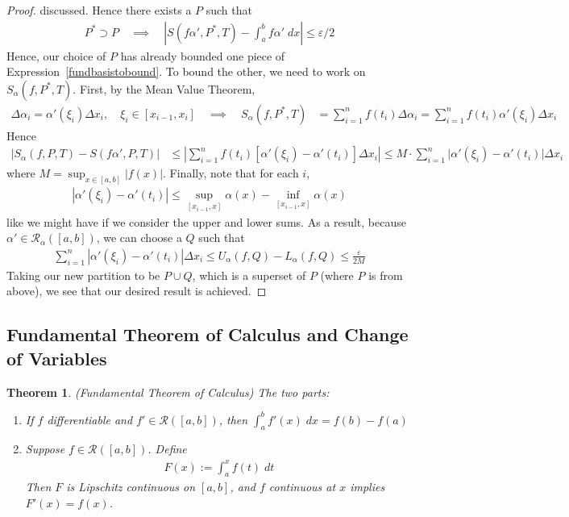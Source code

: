 \documentclass[12pt]{article}
\numberwithin{equation}{section} %
\theoremstyle{plain}
\newtheorem{thm}{Theorem}[section]
\theoremstyle{definition}
\theoremstyle{remark}
\begin{document}
\begin{proof}
discussed. Hence there exists a $P$ such that
\begin{align*}
  P^*\supset P
  \quad\implies\quad
  \left\lvert S(f\alpha',P^*,T) - \int^b_a f\alpha'\;dx
  \right\rvert \leq \varepsilon/2
\end{align*}
Hence, our choice of $P$ has already bounded one piece
of Expression~\ref{fundbasistobound}. To bound the other, we need to
work on $S_\alpha(f,P^*,T)$. First, by the Mean Value Theorem,
\begin{align*}
  \Delta\alpha_i = \alpha'(\xi_i) \Delta x_i,
  \quad \xi_i \in [x_{i-1}, x_i]
  \quad\implies\quad
  S_\alpha(f,P^*,T)
  &= \sum^n_{i=1} f(t_i) \Delta\alpha_i
  = \sum^n_{i=1} f(t_i)\alpha'(\xi_i) \Delta x_i
\end{align*}
Hence
\begin{align*}
  \left\lvert S_\alpha(f,P,T) - S(f\alpha',P,T)
      \right\rvert &\leq
      \left\lvert \sum^n_{i=1} f(t_i)\left[\alpha'(\xi_i) -
      \alpha'(t_i)\right] \Delta x_i \right\rvert
  \leq M \cdot
      \sum^n_{i=1} \big\lvert \alpha'(\xi_i) -
      \alpha'(t_i)\big\rvert \Delta x_i
\end{align*}
where $M =\sup_{x\in[a,b]}\left\lvert f(x)\right\rvert$. Finally, note
that for each $i$,
\begin{align*}
    |\alpha'(\xi_i) - \alpha'(t_i)| \leq
    \sup_{[x_{i-1}, x]} \alpha(x) -
    \inf_{[x_{i-1}, x]} \alpha(x)
\end{align*}
like we might have if we consider the upper and lower sums. As a result,
because $\alpha'\in\mathscr{R}_\alpha([a,b])$, we can choose a $Q$ such
that
\begin{align*}
    \sum^n_{i=1} \left\lvert \alpha'(\xi_i) -
    \alpha'(t_i)\right\rvert \Delta x_i
    \leq U_\alpha(f,Q) - L_\alpha(f,Q) \leq \frac{\varepsilon}{2M}
\end{align*}
Taking our new partition to be $P \cup Q$, which is a superset of $P$
(where $P$ is from above), we see that our desired result is achieved.
\end{proof}

\newpage
\subsection{Fundamental Theorem of Calculus and Change of Variables}

\begin{thm}\emph{(Fundamental Theorem of Calculus)}
\label{ftc}
The two parts:
\begin{enumerate}[label=\emph{\Roman*.}]
  \item
    If $f$ differentiable and $f'\in\mathscr{R}([a,b])$, then
    $\int^b_a f'(x)\;dx = f(b) - f(a)$
  \item
    Suppose $f\in\mathscr{R}([a,b])$.
    Define
    \begin{align*}
      F(x) := \int^x_a f(t)\;dt
    \end{align*}
    Then $F$ is Lipschitz continuous on $[a,b]$,
    and $f$ continuous at $x$ implies $F'(x)=f(x)$.
\end{enumerate}
\end{thm}
\end{document}
